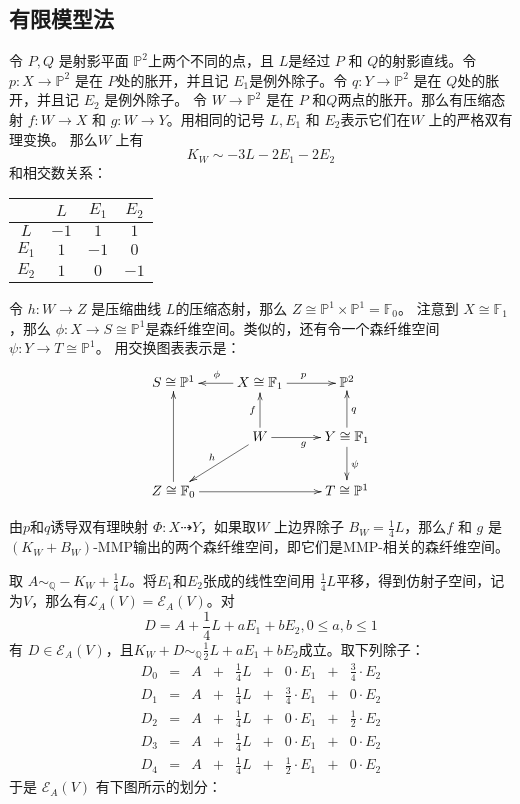 \subsection{有限模型法}
令  $P,Q$ 是射影平面 $\mathbb{P}^{2}$上两个不同的点，且 $L$是经过 $P$ 和 $Q$的射影直线。令 $p:X\to \mathbb{P}^{2}$ 是在 $P$处的胀开，并且记 $E_{1}$是例外除子。令 $q:Y\to \mathbb{P}^{2}$ 是在 $Q$处的胀开，并且记 $E_{2}$ 是例外除子。 令 $W\to \mathbb{P}^{2}$ 是在  $P$ 和$Q$两点的胀开。那么有压缩态射 $f:W\to X$ 和 $g:W\to Y$。用相同的记号 $L,E_{1}$ 和 $E_{2}$表示它们在$W$ 上的严格双有理变换。 那么$W$ 上有
\[
  K_{W}\sim -3L-2E_{1}-2E_{2}
\]
和相交数关系： 
\begin{center}
  \begin{tabular}{cccc}
        \hline
                 & $L$  & $E_{1}$ & $E_{2}$ \\
        \hline
        $L$      & $-1$ & $1$     & $1$ \\
        $E_{1}$  & $1$  & $-1$    & $0$ \\
        $E_{2}$  & $1$  & $0$     & $-1$ \\
        \hline
    \end{tabular}
\end{center}
令  $h:W\to Z$ 是压缩曲线 $L$的压缩态射，那么 $Z\cong \mathbb{P}^{1} \times \mathbb{P}^{1}=\mathbb{F}_{0}$。 注意到 $X\cong \mathbb{F}_{1}$，那么 $\phi:X\to S \cong \mathbb{P}^{1}$是森纤维空间。类似的，还有令一个森纤维空间 $\psi: Y\to T\cong \mathbb{P}^{1}$。 用交换图表表示是：
\[ \xymatrix{
    S\cong \mathbb{P}^{1}&X\cong \mathbb{F}_{1}\ar[l]_{\phi}\ar[r]^{p} & \mathbb{P}^{2} \\
    &W\ar[u]^{f}\ar[r]_{g}\ar[ld]_{h} & Y\cong \mathbb{F}_{1}\ar[u]_{q}\ar[d]^{\psi}\\
    Z\cong \mathbb{F}_{0}\ar[uu]\ar[rr]&&T\cong \mathbb{P}^{1} } \]

由$p$和$q$诱导双有理映射 $\Phi: X\dashrightarrow  Y$，如果取$W$ 上边界除子 $B_{W}=\frac{1}{4}L$，那么$f$ 和 $g$ 是 $(K_{W}+B_{W})$-MMP输出的两个森纤维空间，即它们是MMP-相关的森纤维空间。

取 $A\sim_{\mathbb{Q}}-K_{W}+\frac{1}{4}L$。将$E_{1}$和$E_{2}$张成的线性空间用  $\frac{1}{4}L$平移，得到仿射子空间，记为$V$，那么有$\mathcal{L}_{A}(V)=\mathcal{E}_{A}(V)$。对
\[ D=A+ \frac{1}{4}L +aE_{1}+bE_{2},0\leqslant a,b\leqslant 1 \]
有 $D \in \mathcal{E}_{A}(V)$，且$K_{W}+D\sim_{\mathbb{Q}} \frac{1}{2}L+aE_{1}+bE_{2}$成立。取下列除子：
\[ \begin{array}{rllllllll}
  D_{0}&=&A& +& \frac{1}{4}L& + &0\cdot E_{1}            &+& \frac{3}{4}\cdot E_{2} \\
  D_{1}&=&A& +& \frac{1}{4}L& + & \frac{3}{4}\cdot E_{1} &+& 0 \cdot E_{2} \\
  D_{2}&=&A& +& \frac{1}{4}L& + &0\cdot E_{1}            &+& \frac{1}{2}\cdot E_{2} \\
  D_{3}&=&A& +& \frac{1}{4}L& + & 0\cdot  E_{1}          &+& 0 \cdot E_{2} \\
  D_{4}&=&A& +& \frac{1}{4}L& + & \frac{1}{2}\cdot E_{1} &+& 0 \cdot E_{2}
  \end{array} \]
于是 $\mathcal{E}_{A}(V)$ 有下图所示的划分：

